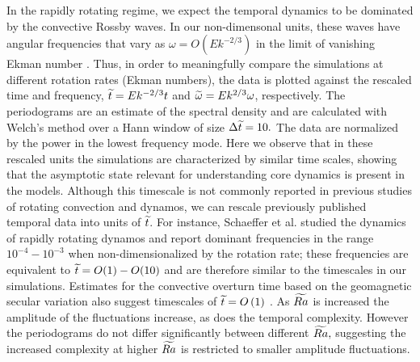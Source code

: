 In the rapidly rotating regime, we expect the temporal dynamics to be dominated by the convective Rossby waves. In our non-dimensonal units, these waves have angular frequencies that vary as $\omega =O( Ek^{-2/3})$ \textcolor{\revtxt}{in the limit of vanishing Ekman number \citep[e.g.][]{cJ00}}. 
Thus, in order to meaningfully compare the simulations at different rotation rates \textcolor{\revtxt}{(Ekman numbers)}, the data is plotted against the rescaled time and frequency, $\tt = Ek^{-2/3} t$ and $\ot = Ek^{2/3} \omega$, respectively.
The periodograms are an estimate of the spectral density and are calculated with Welch's method \citep{pW67} over a Hann window of size $\textcolor{\revtxt}{\Delta}\widetilde{t} = 10.$ \textcolor{\revtxt}{The data are normalized by the power in the lowest frequency mode.}
Here we observe that in these rescaled units the simulations are characterized by similar time scales, showing that the asymptotic state relevant for understanding core dynamics is present in the models.
\textcolor{\revtxt}{
	Although this timescale is not commonly reported in previous studies of rotating convection and dynamos, we can rescale previously published temporal data into units of $\tt$. For instance, Schaeffer et al. \citep{nS17} studied the dynamics of rapidly rotating dynamos and report dominant frequencies in the range $10^{-4} - 10^{-3}$ when non-dimensionalized by the rotation rate; these frequencies are equivalent to $\tt = O(1) - O(10)$ and are therefore similar to the timescales in our simulations.
}
\textcolor{\revttxt}{
	Estimates for the convective overturn time based on the geomagnetic secular variation also suggest timescales of $\tt = O\lb 1\rb$ \citep{cB16}.
}
As $\Rat$ is increased the amplitude of the fluctuations increase, as does the temporal  complexity. However the periodograms do not differ significantly between different $\Rat,$ suggesting the increased complexity at higher $\Rat$ is restricted to smaller amplitude fluctuations.

